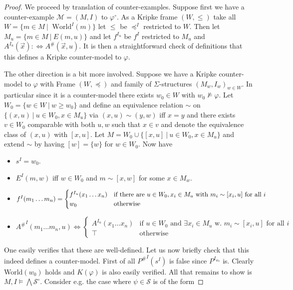 \documentclass[a4paper,12pt]{report}
\theoremstyle{definition}
\theoremstyle{definition}
\theoremstyle{definition}
\theoremstyle{definition}
\theoremstyle{definition}
\theoremstyle{definition}
\theoremstyle{definition}
\begin{document}
	\begin{proof}
		We proceed by translation of counter-examples. Suppose first we have a counter-example $\mathcal M = (M, I)$ to $\varphi^\circ$. As a Kripke frame $(W, \leq)$ take all $ W = \{m\in M\:|\:\text{ World}^I(m)\}$ let $\leq$ be $\preceq^I$ restricted to $W$. Then let $M_u = \{m\in M\:|\: E(m, u)\}$ and let $f^{I_u}$ be $f^I$ restricted to $M_u$ and $A^{I_u}(\vec x): \Leftrightarrow A^\#(\vec x, u)$. It is then a straightforward check of definitions that this defines a Kripke counter-model to $\varphi$.
		
		The other direction is a bit more involved. Suppose we have a Kripke counter-model to $\varphi$ with Frame $(W, \preceq)$ and family of $\Sigma$-structures $(M_w, I_w)_{w\in W}$. In particular since it is a counter-model there exists $w_0\in W$ with $w_0\not\models\varphi$. Let $W_0 = \{w\in W\:|\: w\geq w_0\}$ and define an equivalence relation $\sim$ on $\{(x, u)\:|\:u\in W_0, x\in M_u\}$ via $(x, u)\sim (y, w)$ iff $x = y$ and there exists $v\in W_0$ comparable with both $u, w$ such that $x\in v$ and denote the equivalence class of $(x, u)$ with $[x, u]$. Let $M = W_0\cup \{[x, u]\:|\:u\in W_0, x\in M_u\}$ and extend $\sim$ by having $[w] = \{w\}$ for $w\in W_0$. Now have
		\begin{itemize}
			\item $s^I = w_0$.
			\item $E^I(m, w)$ iff $w\in W_0$ and $m \sim [x, w]$ for some $x\in M_w$.
			\item $f^I(m_1\dots m_n) =\begin{cases}
				f^{I_u}(x_1\dots x_n) &\text{if there are $ u\in W_0, x_i\in M_u$ with $m_i\sim [x_i, u]$ for all $i$}\\
				w_0 & \text{otherwise}
			\end{cases}$
			\item ${A^\#}^I(m_1\dots m_n, u) \Leftrightarrow\begin{cases}
				A^{I_u}(x_1\dots x_n) &\text{if $u\in W_0$ and $\exists x_i\in M_u$ w. $m_i\sim [x_i, u]$ for all $i$}\\
				\top & \text{otherwise}
			\end{cases}$
		\end{itemize}
		One easily verifies that these are well-defined. Let us now briefly check that this indeed defines a counter-model. First of all ${P^\#}^I(s^I)$ is false since $P^{I_{w_0}}$ is. Clearly World$(w_0)$ holds and $K(\varphi)$ is also easily verified. All that remains to show is $M, I\models\bigwedge\mathcal S^\circ$. Consider e.g. the case where $\psi\in\mathcal S$ is of the form

\end{proof}
\end{document}

